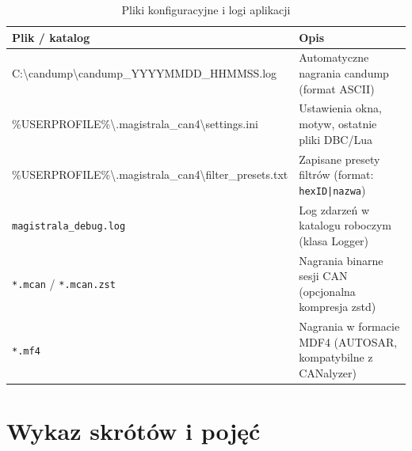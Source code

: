 \documentclass[12pt, a4paper]{article}
\begin{document}
\begin{table}[H]
\caption{Pliki konfiguracyjne i logi aplikacji}
\label{tab:logs}
\centering
\small
\begin{tabular}{p{7.5cm}p{7.5cm}}
\toprule
\textbf{Plik / katalog} & \textbf{Opis} \\
\midrule
{\footnotesize\ttfamily C:\textbackslash{}candump\textbackslash{}candump\_YYYYMMDD\_HHMMSS.log} &
Automatyczne nagrania candump (format ASCII) \\[4pt]
{\footnotesize\ttfamily \%USERPROFILE\%\textbackslash{}.magistrala\_can4\textbackslash{}\linebreak[4]settings.ini} &
Ustawienia okna, motyw, ostatnie pliki DBC/Lua \\[4pt]
{\footnotesize\ttfamily \%USERPROFILE\%\textbackslash{}.magistrala\_can4\textbackslash{}\linebreak[4]filter\_presets.txt} &
Zapisane presety filtrów (format: \texttt{hexID|nazwa}) \\[4pt]
\texttt{magistrala\_debug.log} &
Log zdarzeń w katalogu roboczym (klasa Logger) \\[4pt]
\texttt{*.mcan} / \texttt{*.mcan.zst} &
Nagrania binarne sesji CAN (opcjonalna kompresja zstd) \\[4pt]
\texttt{*.mf4} &
Nagrania w formacie MDF4 (AUTOSAR, kompatybilne z CANalyzer) \\
\bottomrule
\end{tabular}
\end{table}

\section{Wykaz skrótów i pojęć}
\end{document}
